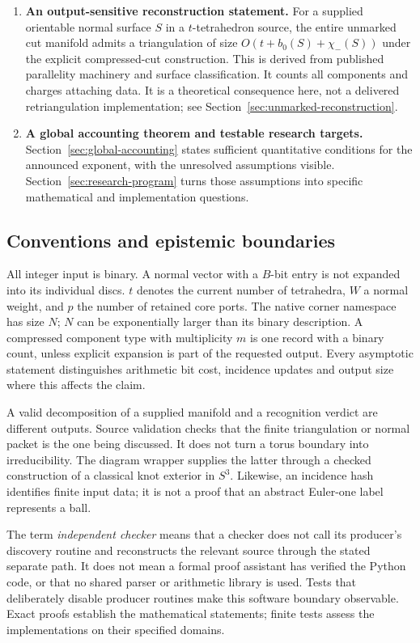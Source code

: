 \begin{enumerate}
\item \textbf{An output-sensitive reconstruction statement.}
For a supplied orientable normal surface $S$ in a $t$-tetrahedron source,
the entire unmarked cut manifold admits a triangulation of size
$O(t+b_0(S)+\chi_-(S))$ under the explicit compressed-cut construction.
This is derived from published parallelity machinery and surface
classification.  It counts all components and charges attaching data.
It is a theoretical consequence here, not a delivered retriangulation
implementation; see Section~\ref{sec:unmarked-reconstruction}.

\item \textbf{A global accounting theorem and testable research targets.}
Section~\ref{sec:global-accounting} states sufficient quantitative
conditions for the announced exponent, with the unresolved assumptions
visible.  Section~\ref{sec:research-program} turns those assumptions into
specific mathematical and implementation questions.
\end{enumerate}

\subsection{Conventions and epistemic boundaries}

All integer input is binary.  A normal vector with a $B$-bit entry is not
expanded into its individual discs.  $t$ denotes the current number of
tetrahedra, $W$ a normal weight, and $p$ the number of retained core ports.
The native corner namespace has size $N$; $N$ can be exponentially larger
than its binary description.  A compressed component type with multiplicity
$m$ is one record with a binary count, unless explicit expansion is part of
the requested output.  Every asymptotic statement distinguishes arithmetic
bit cost, incidence updates and output size where this affects the claim.

A valid decomposition of a supplied manifold and a recognition verdict are
different outputs.  Source validation checks that the finite triangulation
or normal packet is the one being discussed.  It does not turn a torus
boundary into irreducibility.  The diagram wrapper supplies the latter
through a checked construction of a classical knot exterior in $S^3$.
Likewise, an incidence hash identifies finite input data; it is not a proof
that an abstract Euler-one label represents a ball.

The term \emph{independent checker} means that a checker does not call its
producer's discovery routine and reconstructs the relevant source through
the stated separate path.  It does not mean a formal proof assistant has
verified the Python code, or that no shared parser or arithmetic library is
used.  Tests that deliberately disable producer routines make this software
boundary observable.  Exact proofs establish the mathematical statements;
finite tests assess the implementations on their specified domains.

